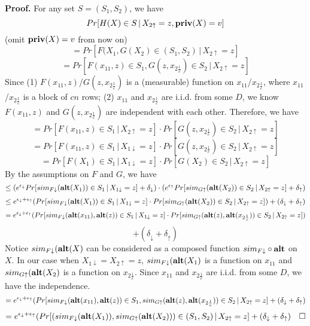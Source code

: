 \documentclass[11pt]{article}
\begin{document}
{\bf Proof. } For any set $S=(S_{1}, S_{2})$, we have
\[
Pr[H(X) \in S\,|\, X_{2 \uparrow}=z, {{\bf priv}(X)=v} ]
\]
(omit ${{\bf priv}(X)=v}$ from now on)
\[
= Pr[F(X_{1}, G(X_{2}) \in (S_{1}, S_{2})\,|\, X_{2 \uparrow}=z ]
\]
\[
=Pr[F(x_{11}, z) \in S_{1}, G(z, x_{2 \frac{1}{c}}) \in S_{2} \,|\, X_{2 \uparrow}=z ]
\]
Since (1) $F(x_{11}, z)$/$G(z, x_{2 \frac{1}{c}})$ is a (measurable) function on $x_{11}$/$x_{2 \frac{1}{c}}$, where $x_{11}$/$x_{2 \frac{1}{c}}$ is a block of $cn$ rows; (2) $x_{11}$ and $x_{2 \frac{1}{c}}$ are i.i.d. from some $D$, we know $F(x_{11}, z)$ and $G(z, x_{2 \frac{1}{c}})$ are independent with each other. Therefore, we have
\[
= Pr[F(x_{11}, z) \in S_{1} \,|\, X_{2 \uparrow}=z ] \cdot Pr[G(z, x_{2 \frac{1}{c}}) \in S_{2}  \,|\, X_{2 \uparrow}=z ] 
\]
\[
=Pr[F(x_{11}, z) \in S_{1} \,|\, X_{1 \downarrow}=z ] \cdot Pr[G(z, x_{2 \frac{1}{c}}) \in S_{2}  \,|\, X_{2 \uparrow}=z ] 
\]
\[
= Pr[F(X_{1}) \in S_{1} \,|\, X_{1 \downarrow}=z ] \cdot Pr[G(X_{2}) \in S_{2}  \,|\, X_{2 \uparrow}=z ] 
\]
By the assumptions on $F$ and $G$, we have
\[
\leq (e^{\epsilon_{\downarrow}}Pr[sim_{F\downarrow}({\bf alt}(X_{1})) \in S_{1} \,|\, X_{1 \downarrow}=z ] +\delta_{\downarrow}) \cdot (e^{\epsilon_{\uparrow}}Pr[sim_{G\uparrow}({\bf alt}(X_{2})) \in S_{2} \,|\, X_{2 \uparrow}=z ] +\delta_{\uparrow})
\]
\[
\leq e^{\epsilon_{\downarrow}+\epsilon_{\uparrow}} (Pr[sim_{F\downarrow}({\bf alt}(X_{1})) \in S_{1} \,|\, X_{1 \downarrow}=z ] \cdot Pr[sim_{G\uparrow}({\bf alt}(X_{2})) \in S_{2} \,|\, X_{2 \uparrow}=z ]) + (\delta_{\downarrow}+\delta_{\uparrow})
\]
\[
= e^{\epsilon_{\downarrow}+\epsilon_{\uparrow}} (Pr[sim_{F\downarrow}({\bf alt}(x_{11}), {\bf alt}(z)) \in S_{1} \,|\, X_{1 \downarrow}=z ] \cdot Pr[sim_{G\uparrow}({\bf alt}(z), {\bf alt} (x_{2 \frac{1}{c}})) \in S_{2} \,|\, X_{2 \uparrow}=z ]) 
\]
\[
+ (\delta_{\downarrow}+\delta_{\uparrow})
\]
Notice $sim_{F\downarrow}({\bf alt}(X)$ can be considered as a composed function $sim_{F\downarrow} \circ {\bf alt}$ on $X$. In our case when $X_{1 \downarrow}=X_{2 \uparrow}=z$, $sim_{F\downarrow}({\bf alt}(X_{1})$ is a function on $x_{11}$ and $sim_{G\uparrow}({\bf alt}(X_{2})$ is a function on $x_{2\frac{1}{c}}$. Since $x_{11}$ and $x_{2 \frac{1}{c}}$ are i.i.d. from some $D$, we have the independence. 
\[
=e^{\epsilon_{\downarrow}+\epsilon_{\uparrow}} (Pr[sim_{F\downarrow}({\bf alt}(x_{11}), {\bf alt}(z)) \in S_{1}, sim_{G\uparrow}({\bf alt}(z), {\bf alt} (x_{2 \frac{1}{c}})) \in S_{2} \,|\, X_{2 \uparrow}=z ]+ (\delta_{\downarrow}+\delta_{\uparrow})
\]
\[
=e^{\epsilon_{\downarrow}+\epsilon_{\uparrow}} (Pr[(sim_{F\downarrow}({\bf alt}(X_{1})), sim_{G\uparrow}({\bf alt} (X_{2}))) \in (S_{1}, S_{2}) \,|\, X_{2 \uparrow}=z ]+ (\delta_{\downarrow}+\delta_{\uparrow}) \quad \Box
\]\\
\end{document}
